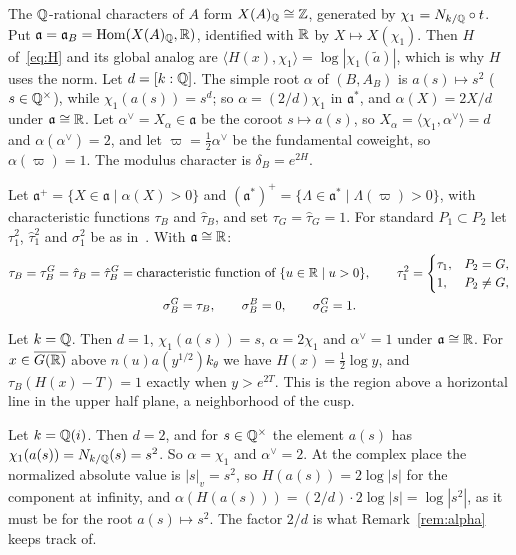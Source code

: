 The $\mathbb{Q}$-rational characters of $A$ form $X(A)_{\mathbb{Q}}\cong\mathbb{Z}$, generated by
$\chi_1=N_{k/\mathbb{Q}}\circ t$. Put $\mathfrak a=\mathfrak a_B=
\operatorname{Hom}(X(A)_{\mathbb{Q}},\mathbb{R})$, identified with $\mathbb{R}$ by $X\mapsto X(\chi_1)$. Then
$H$ of~\eqref{eq:H} and its global analog are
$\langle H(x),\chi_1\rangle=\log|\chi_1(\tilde a)|$, which is why $H$
uses the norm. Let $d=[k:\mathbb{Q}]$. The simple root $\alpha$ of $(B,A_B)$ is
$a(s)\mapsto s^2$ ($s\in\mathbb{Q}^\times$), while $\chi_1(a(s))=s^d$; so
$\alpha=(2/d)\chi_1$ in $\mathfrak a^*$, and $\alpha(X)=2X/d$ under
$\mathfrak a\cong\mathbb{R}$. Let $\alpha^\vee=X_\alpha\in\mathfrak a$ be the
coroot $s\mapsto a(s)$, so $X_\alpha=\langle\chi_1,\alpha^\vee\rangle=d$
and $\alpha(\alpha^\vee)=2$, and let $\varpi=\tfrac12\alpha^\vee$ be the
fundamental coweight, so $\alpha(\varpi)=1$. The modulus character is
$\delta_B=e^{2H}$.

Let $\mathfrak a^+=\{X\in\mathfrak a\mid\alpha(X)>0\}$ and
$(\mathfrak a^*)^+=\{\Lambda\in\mathfrak a^*\mid\Lambda(\varpi)>0\}$,
with characteristic functions $\tau_B$ and $\hat\tau_B$, and set
$\tau_G=\hat\tau_G=1$. For standard $P_1\subset P_2$ let
$\tau_1^2$, $\hat\tau_1^2$ and $\sigma_1^2$ be as in~\cite{Ar78}. With
$\mathfrak a\cong\mathbb{R}$:
\begin{gather}
\tau_B=\tau_B^G=\hat\tau_B=\hat\tau_B^G
=\text{characteristic function of }\{u\in\mathbb{R}\mid u>0\},\qquad
\tau_1^2=\begin{cases}\tau_1,&P_2=G,\\1,&P_2\ne G,\end{cases}
\label{eq:tau}\\
\sigma_B^G=\tau_B,\qquad\sigma_B^B=0,\qquad\sigma_G^G=1.
\label{eq:sigma}
\end{gather}

\begin{example}\label{ex:chambers}
Let $k=\mathbb{Q}$. Then $d=1$, $\chi_1(a(s))=s$, $\alpha=2\chi_1$ and
$\alpha^\vee=1$ under $\mathfrak a\cong\mathbb{R}$. For $x\in\overline{G(\mathbb{R})}$
above $n(u)a(y^{1/2})k_\theta$ we have $H(x)=\frac12\log y$, and
$\tau_B(H(x)-T)=1$ exactly when $y>e^{2T}$. This is the region above a
horizontal line in the upper half plane, a neighborhood of the cusp.

Let $k=\mathbb{Q}(i)$. Then $d=2$, and for $s\in\mathbb{Q}^\times$ the element $a(s)$ has
$\chi_1(a(s))=N_{k/\mathbb{Q}}(s)=s^2$. So $\alpha=\chi_1$ and $\alpha^\vee=2$.
At the complex place the normalized absolute value is $|s|_v=s^2$, so
$H(a(s))=2\log|s|$ for the component at infinity, and
$\alpha(H(a(s)))=(2/d)\cdot2\log|s|=\log|s^2|$, as it must be for the
root $a(s)\mapsto s^2$. The factor $2/d$ is what Remark~\ref{rem:alpha}
keeps track of.
\end{example}


